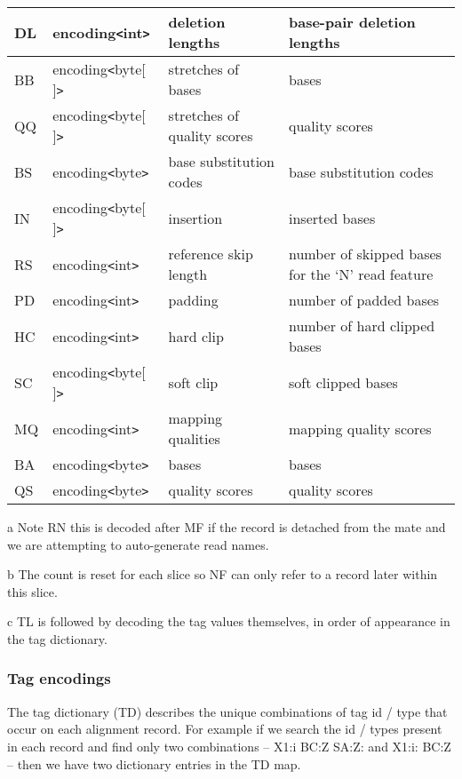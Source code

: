 \documentclass[a4paper]{article}
\begin{document}
\begin{threeparttable}[t]
\begin{tabular}{|l|l|>{\raggedright}p{100pt}|>{\raggedright}p{220pt}|}
DL & encoding\texttt{<}int\texttt{>} & deletion lengths & base-pair deletion lengths\tabularnewline
\hline
BB & encoding\texttt{<}byte[ ]\texttt{>} & stretches of bases & bases\tabularnewline
\hline
QQ & encoding\texttt{<}byte[ ]\texttt{>} & stretches of quality scores & quality scores\tabularnewline
\hline
BS & encoding\texttt{<}byte\texttt{>} & base substitution codes & base substitution
codes\tabularnewline
\hline
IN & encoding\texttt{<}byte[ ]\texttt{>} & insertion & inserted bases\tabularnewline
\hline
RS & encoding\texttt{<}int\texttt{>} & reference skip length & number of skipped 
bases for the `N' read feature\tabularnewline
\hline
PD & encoding\texttt{<}int\texttt{>} & padding & number of padded bases\tabularnewline
\hline
HC & encoding\texttt{<}int\texttt{>} & hard clip & number of hard clipped bases\tabularnewline
\hline
SC & encoding\texttt{<}byte[ ]\texttt{>} & soft clip & soft clipped bases\tabularnewline
\hline
MQ & encoding\texttt{<}int\texttt{>} & mapping qualities & mapping quality scores\tabularnewline
\hline
BA & encoding\texttt{<}byte\texttt{>} & bases & bases\tabularnewline
\hline
QS & encoding\texttt{<}byte\texttt{>} & quality scores & quality scores\tabularnewline
\hline
\end{tabular}

\begin{tablenotes}
\item{a} Note RN this is decoded after MF if the record is detached from the mate and we are attempting to auto-generate read names.
\item{b} The count is reset for each slice so NF can only refer to a record later within this slice.
\item{c} TL is followed by decoding the tag values themselves, in order of appearance in the tag dictionary.
\end{tablenotes}
\end{threeparttable}

\subsubsection*{Tag encodings}
\label{subsubsec:tags}

The tag dictionary (TD) describes the unique combinations of tag id / type that occur on each alignment record.
For example if we search the id / types present in each record and find only two combinations -- X1:i BC:Z SA:Z: and X1:i: BC:Z -- then we have two dictionary entries in the TD map.
\end{document}
